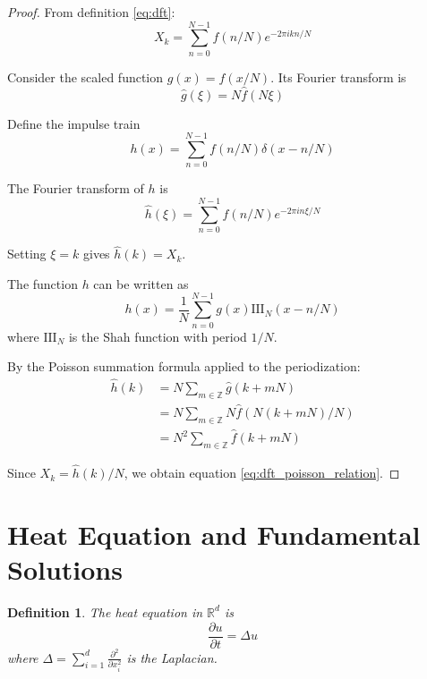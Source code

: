 \documentclass{article}
\newtheorem{definition}{Definition}
\begin{document}
\begin{proof}
From definition \eqref{eq:dft}:
\begin{equation}
\label{eq:dft_expanded}
X_k = \sum_{n=0}^{N-1} f(n/N) e^{-2\pi i k n / N}
\end{equation}

Consider the scaled function $g(x) = f(x/N)$. Its Fourier transform is
\begin{equation}
\label{eq:scaled_fourier}
\hat{g}(\xi) = N \hat{f}(N\xi)
\end{equation}

Define the impulse train
\begin{equation}
\label{eq:impulse_train}
h(x) = \sum_{n=0}^{N-1} f(n/N) \delta(x - n/N)
\end{equation}

The Fourier transform of $h$ is
\begin{equation}
\label{eq:impulse_fourier}
\hat{h}(\xi) = \sum_{n=0}^{N-1} f(n/N) e^{-2\pi i n \xi / N}
\end{equation}

Setting $\xi = k$ gives $\hat{h}(k) = X_k$.

The function $h$ can be written as
\begin{equation}
\label{eq:h_periodic}
h(x) = \frac{1}{N} \sum_{n=0}^{N-1} g(x) \text{III}_N(x - n/N)
\end{equation}
where $\text{III}_N$ is the Shah function with period $1/N$.

By the Poisson summation formula applied to the periodization:
\begin{align}
\hat{h}(k) &= N \sum_{m \in \mathbb{Z}} \hat{g}(k + mN) \label{eq:poisson_applied}\\
&= N \sum_{m \in \mathbb{Z}} N \hat{f}(N(k + mN)/N) \label{eq:scaling_applied}\\
&= N^2 \sum_{m \in \mathbb{Z}} \hat{f}(k + mN) \label{eq:simplified}
\end{align}

Since $X_k = \hat{h}(k)/N$, we obtain equation \eqref{eq:dft_poisson_relation}.
\end{proof}

\section{Heat Equation and Fundamental Solutions}

\begin{definition}
The heat equation in $\mathbb{R}^d$ is
\begin{equation}
\label{eq:heat}
\frac{\partial u}{\partial t} = \Delta u
\end{equation}
where $\Delta = \sum_{i=1}^d \frac{\partial^2}{\partial x_i^2}$ is the Laplacian.
\end{definition}
\end{document}
